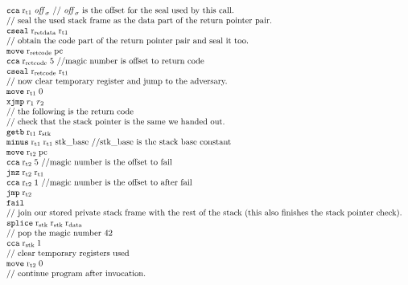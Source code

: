 \documentclass[a4paper]{article}
\begin{document}
\[\begin{array}{l}
    \tcca{\rtmp{1}}{\offsigma}\text{ // $\offsigma$ is the offset for the seal used by this call.}\\
    \text{// seal the used stack frame as the data part of the return pointer pair.}\\
    \tcseal{\rretd}{\rtmp{1}}\\
    \text{// obtain the code part of the return pointer pair and seal it too.}\\
    \tmove{\rretc}{\pcreg}\\
    \tcca{\rretc}{5} \text{ //magic number is offset to return code}\\
    \tcseal{\rretc}{\rtmp{1}}\\
    \text{// now clear temporary register and jump to the adversary.}\\
    \tmove{\rtmp{1}}{0}\\
    \txjmp{r_1}{r_2}\\
    \text{// the following is the return code}\\
    \text{// check that the stack pointer is the same we handed out.}\\
    \tgetb{\rtmp{1}}{\rstk}\\
    \tminus{\rtmp{1}}{\rtmp{1}}{\stkb} \text{ //$\stkb$ is the stack base constant} \\
    \tmove{\rtmp{2}}{\pcreg}\\
    \tcca{\rtmp{2}}{5} \text{ //magic number is the offset to fail} \\
    \tjnz{\rtmp{2}}{\rtmp{1}} \\
    \tcca{\rtmp{2}}{1} \text{ //magic number is the offset to after fail} \\
    \tjmp{\rtmp{2}} \\
    \tfail \\
    \text{// join our stored private stack frame with the rest of the stack (this also finishes the stack pointer check).}\\
    \tsplice{\rstk}{\rstk}{\rdata} \\
    \text{// pop the magic number 42}\\
    \tcca{\rstk}{1}\\
    \text{// clear temporary registers used}\\
    \tmove{\rtmp{2}}{0}\\
    \text{// continue program after invocation.}
  \end{array}
\]
\end{document}

